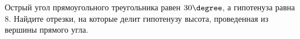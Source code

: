 \begin{ex}
	\begin{condition}
		Острый угол прямоугольного треугольника равен \( 30\degree \), а гипотенуза равна \( 8 \). Найдите отрезки, на которые делит гипотенузу высота, проведенная из вершины прямого угла.
	\end{condition}
\end{ex}